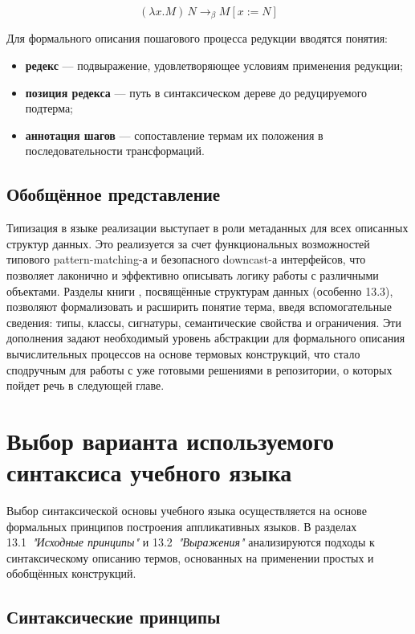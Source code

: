 \[
(\lambda x. M) \, N \rightarrow_\beta M[x := N]
\]

Для формального описания пошагового процесса редукции вводятся понятия:

\begin{itemize}
  \item \textbf{редекс} — подвыражение, удовлетворяющее условиям применения редукции;
  \item \textbf{позиция редекса} — путь в синтаксическом дереве до редуцируемого подтерма;
  \item \textbf{аннотация шагов} — сопоставление термам их положения в последовательности трансформаций.
\end{itemize}

\subsection*{Обобщённое представление}

Типизация в языке реализации выступает в роли метаданных для всех описанных структур данных. Это реализуется за счет функциональных возможностей типового pattern-matching-а и безопасного downcast-а интерфейсов, что позволяет лаконично и эффективно описывать логику работы с различными объектами.
Разделы книги \cite{Wolfengagen2004}, посвящённые структурам данных (особенно 13.3), позволяют формализовать и расширить понятие терма, введя вспомогательные сведения: типы, классы, сигнатуры, семантические свойства и ограничения. Эти дополнения задают необходимый уровень абстракции для формального описания вычислительных процессов на основе термовых конструкций, что стало сподручным для работы с уже готовыми решениями в репозитории, о которых пойдет речь в следующей главе.
\section{Выбор варианта используемого синтаксиса учебного языка}
\label{sec:syntax-choice}

Выбор синтаксической основы учебного языка осуществляется на основе формальных принципов построения аппликативных языков\cite{Wolfengagen2004}. В разделах 13.1~\textit{"Исходные принципы"} и 13.2~\textit{"Выражения"} анализируются подходы к синтаксическому описанию термов, основанных на применении простых и обобщённых конструкций.

\subsection*{Синтаксические принципы}

